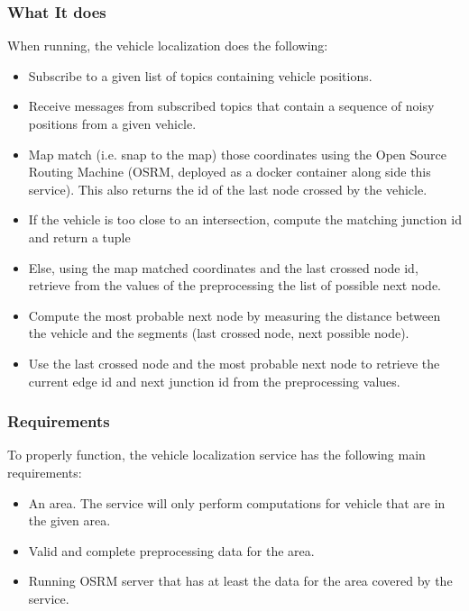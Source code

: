 \documentclass[letterpaper,10pt,english]{sphinxmanual}
\begin{document}
\subsubsection{What It does}
\label{\detokenize{microservices/vehicle_localization/introduction:what-it-does}}
When running, the vehicle localization does the following:
\begin{itemize}
\item {} 
Subscribe to a given list of topics containing vehicle positions.

\item {} 
Receive messages from subscribed topics that contain a sequence of noisy positions from a given vehicle.

\item {} 
Map match (i.e. snap to the map) those coordinates using the Open Source Routing Machine (OSRM, deployed as a docker container along side this service).
This also returns the id of the last node crossed by the vehicle.

\item {} 
If the vehicle is too close to an intersection, compute the matching junction id and return a tuple 

\item {} 
Else, using the map matched coordinates and the last crossed node id, retrieve from the values of the preprocessing the list of possible next node.

\item {} 
Compute the most probable next node by measuring the distance between the vehicle and the segments (last crossed node, next possible node).

\item {} 
Use the last crossed node and the most probable next node to retrieve the current edge id and next junction id from the preprocessing values.

\end{itemize}


\subsubsection{Requirements}
\label{\detokenize{microservices/vehicle_localization/introduction:requirements}}
To properly function, the vehicle localization service has the following main requirements:
\begin{itemize}
\item {} 
An area.
The service will only perform computations for vehicle that are in the given area.

\item {} 
Valid and complete preprocessing data for the area.

\item {} 
Running OSRM server that has at least the data for the area covered by the service.

\end{itemize}
\end{document}
